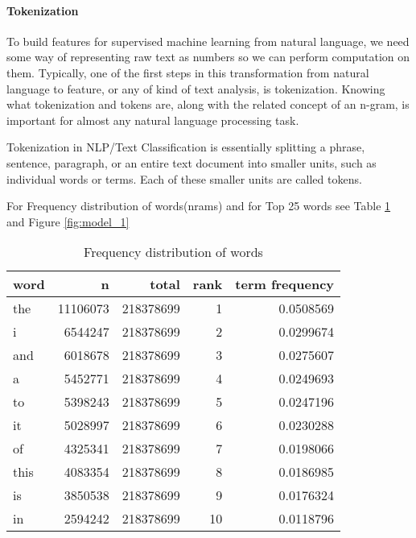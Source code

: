 \documentclass[
]{article}
\begin{document}
\newpage

\hypertarget{tokenization}{%
\paragraph{Tokenization}\label{tokenization}}

To build features for supervised machine learning from natural language,
we need some way of representing raw text as numbers so we can perform
computation on them. Typically, one of the first steps in this
transformation from natural language to feature, or any of kind of text
analysis, is tokenization. Knowing what tokenization and tokens are,
along with the related concept of an n-gram, is important for almost any
natural language processing task.

Tokenization in NLP/Text Classification is essentially splitting a
phrase, sentence, paragraph, or an entire text document into smaller
units, such as individual words or terms. Each of these smaller units
are called tokens.

For Frequency distribution of words(nrams) and for Top 25 words see
Table \ref{tbl:train_words} and Figure \ref{fig:model_1}

\begin{table}

\caption{\label{tab:freq_dist_ngrams}Frequency distribution of words\label{tbl:train_words}}
\centering
\begin{tabular}[t]{lrrrr}
\toprule
word & n & total & rank & term frequency\\
\midrule
the & 11106073 & 218378699 & 1 & 0.0508569\\
i & 6544247 & 218378699 & 2 & 0.0299674\\
and & 6018678 & 218378699 & 3 & 0.0275607\\
a & 5452771 & 218378699 & 4 & 0.0249693\\
to & 5398243 & 218378699 & 5 & 0.0247196\\
it & 5028997 & 218378699 & 6 & 0.0230288\\
of & 4325341 & 218378699 & 7 & 0.0198066\\
this & 4083354 & 218378699 & 8 & 0.0186985\\
is & 3850538 & 218378699 & 9 & 0.0176324\\
in & 2594242 & 218378699 & 10 & 0.0118796\\
\bottomrule
\end{tabular}
\end{table}
\end{document}
